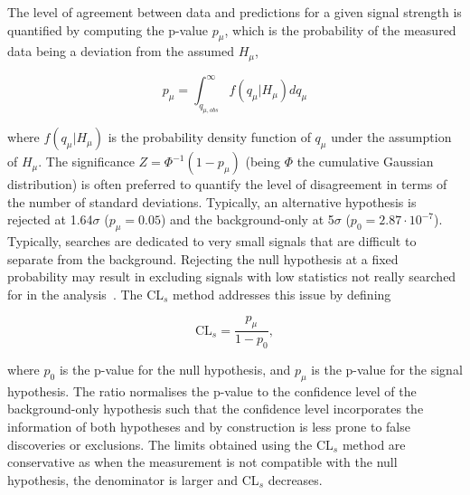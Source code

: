 The level of agreement between data and predictions for a given signal strength is quantified by computing the p-value $p_\mu$, which is the probability of the measured data being a deviation from the assumed $H_\mu$,

\begin{equation}
    p_\mu = \int_{q_{\mu,obs}}^\infty f(q_\mu|H_\mu)dq_\mu
\end{equation}

where $f(q_\mu|H_\mu)$ is the probability density function of $q_\mu$ under the assumption of $H_\mu$. The significance $Z=\Phi^{-1}(1-p_\mu)$ (being $\Phi$ the cumulative Gaussian distribution) is often preferred to quantify the level of disagreement in terms of the number of standard deviations. Typically, an alternative hypothesis is rejected at 1.64$\sigma$ ($p_\mu=0.05$) and the background-only at 5$\sigma$ ($p_0=2.87\cdot10^{-7}$).\\

Typically, searches are dedicated to very small signals that are difficult to separate from the background. Rejecting the null hypothesis at a fixed probability may result in excluding signals with low statistics not really searched for in the analysis~\cite{JUNK1999435}. The CL$_{s}$ method addresses this issue by defining

\begin{equation}
    \text{CL}_{s}=\frac{p_\mu}{1-p_0},
\end{equation}

where $p_0$ is the p-value for the null hypothesis, and $p_\mu$ is the p-value for the signal hypothesis. The ratio normalises the p-value to the confidence level of the background-only hypothesis such that the confidence level incorporates the information of both hypotheses and by construction is less prone to false discoveries or exclusions. The limits obtained using the CL$_s$ method are conservative as when the measurement is not compatible with the null hypothesis, the denominator is larger and CL$_{s}$ decreases.


